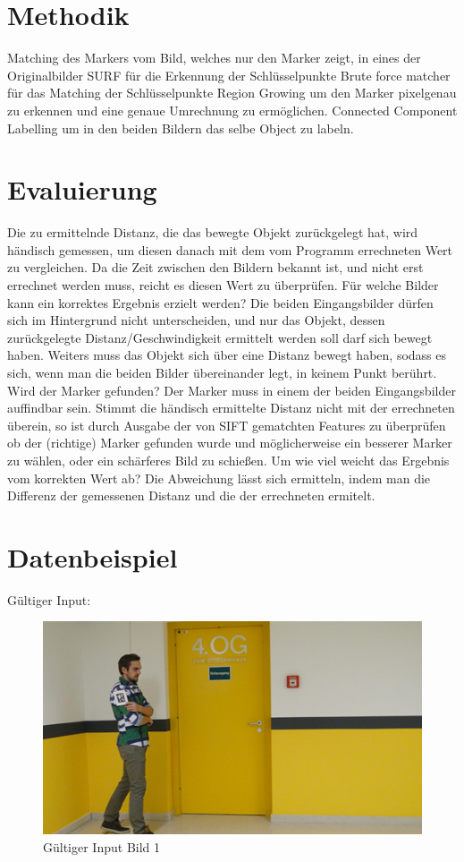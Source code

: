 \documentclass[deutsch]{scrartcl}
\begin{document}
\section{Methodik}
Matching des Markers vom Bild, welches nur den Marker zeigt, in eines der Originalbilder 
SURF für die Erkennung der Schlüsselpunkte
Brute force matcher für das Matching der Schlüsselpunkte
Region Growing um den Marker pixelgenau zu erkennen und eine genaue Umrechnung zu ermöglichen.
Connected Component Labelling um in den beiden Bildern das selbe Object zu labeln.

\section{Evaluierung}
Die zu ermittelnde Distanz, die das bewegte Objekt zurückgelegt hat, wird händisch gemessen, um diesen danach mit dem vom Programm errechneten Wert zu vergleichen. Da die Zeit zwischen den Bildern bekannt ist, und nicht erst errechnet werden muss, reicht es diesen Wert zu überprüfen.
Für welche Bilder kann ein korrektes Ergebnis erzielt werden? Die beiden Eingangsbilder dürfen sich im Hintergrund nicht unterscheiden, und nur das Objekt, dessen zurückgelegte Distanz/Geschwindigkeit ermittelt werden soll darf sich bewegt haben. Weiters muss das Objekt sich über eine Distanz bewegt haben, sodass es sich, wenn man die beiden Bilder übereinander legt, in keinem Punkt berührt.
Wird der Marker gefunden? Der Marker muss in einem der beiden Eingangsbilder auffindbar sein. Stimmt die händisch ermittelte Distanz nicht mit der errechneten überein, so ist durch Ausgabe der von SIFT gematchten Features zu überprüfen ob der (richtige) Marker gefunden wurde und möglicherweise ein besserer Marker zu wählen, oder ein schärferes Bild zu schießen.
Um wie viel weicht das Ergebnis vom korrekten Wert ab? Die Abweichung lässt sich ermitteln, indem man die Differenz der gemessenen Distanz und die der errechneten ermitelt.


\pagebreak


\section{Datenbeispiel}
Gültiger Input:

\begin{figure}[H]
	\centering
	\includegraphics{testimg1.png}
	\caption{Gültiger Input Bild 1}
	\label{fig1}
\end{figure}
\end{document}
